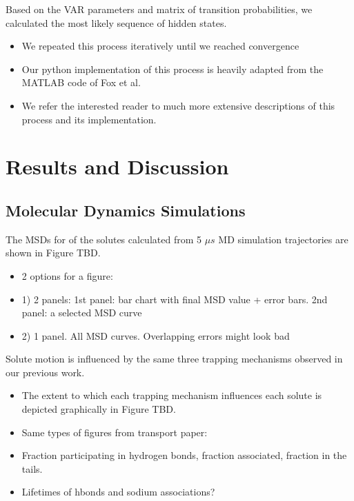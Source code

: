 \documentclass{article}
\begin{document}
  Based on the VAR parameters and matrix of transition probabilities, we calculated
  the most likely sequence of hidden states.
  \begin{itemize}
    \item We repeated this process iteratively until we reached convergence %
    \item Our python implementation of this process is heavily adapted from the MATLAB code
    of Fox et al.~\cite{fox_sticky_2007} 
    \item We refer the interested reader to much more extensive descriptions of 
    this process and its implementation. 
    ~\cite{beal_infinite_2002,teh_hierarchical_2006,van_gael_beam_2008,fox_nonparametric_2009,fox_bayesian_2010}
  \end{itemize}
  \break
  \section{Results and Discussion}
  
  \subsection{Molecular Dynamics Simulations}\label{section:MD_simulations}
  
  The MSDs for of the solutes calculated from 5 $\mu s$ MD simulation trajectories
  are shown in Figure TBD.
  \begin{itemize}
    \item 2 options for a figure:
    \item 1) 2 panels: 1st panel: bar chart with final MSD value + error bars. 2nd panel: a selected MSD curve
    \item 2) 1 panel. All MSD curves. Overlapping errors might look bad
  \end{itemize}
  
  \noindent Solute motion is influenced by the same three trapping mechanisms observed in our
  previous work.
  \begin{itemize} 
    \item The extent to which each trapping mechanism influences each solute is
  	depicted graphically in Figure TBD.
    \item Same types of figures from transport paper:
    \item Fraction participating in hydrogen bonds, fraction associated, fraction
    in the tails.
    \item Lifetimes of hbonds and sodium associations?
  \end{itemize}
  
\end{document}
